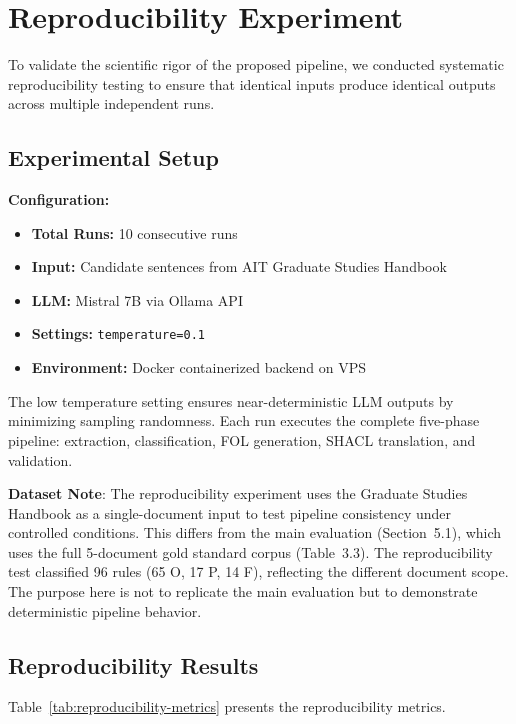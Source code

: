 \section{Reproducibility Experiment}
\label{sec:reproducibility-experiment}

To validate the scientific rigor of the proposed pipeline, we conducted systematic reproducibility testing to ensure that identical inputs produce identical outputs across multiple independent runs.

\subsection{Experimental Setup}

\textbf{Configuration:}
\begin{itemize}
    \item \textbf{Total Runs:} 10 consecutive runs
    \item \textbf{Input:} Candidate sentences from AIT Graduate Studies Handbook
    \item \textbf{LLM:} Mistral 7B via Ollama API
    \item \textbf{Settings:} \texttt{temperature=0.1}
    \item \textbf{Environment:} Docker containerized backend on VPS
\end{itemize}

The low temperature setting ensures near-deterministic LLM outputs by minimizing sampling randomness. Each run executes the complete five-phase pipeline: extraction, classification, FOL generation, SHACL translation, and validation.

\textbf{Dataset Note}: The reproducibility experiment uses the Graduate Studies Handbook as a single-document input to test pipeline consistency under controlled conditions. This differs from the main evaluation (Section~5.1), which uses the full 5-document gold standard corpus (Table~3.3). The reproducibility test classified 96 rules (65 O, 17 P, 14 F), reflecting the different document scope. The purpose here is not to replicate the main evaluation but to demonstrate deterministic pipeline behavior.

\subsection{Reproducibility Results}

Table~\ref{tab:reproducibility-metrics} presents the reproducibility metrics.

